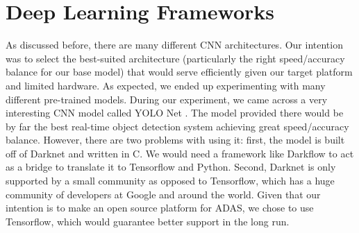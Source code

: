 \section{Deep Learning Frameworks}
As discussed before, there are many different CNN architectures. Our intention was to select the best-suited architecture (particularly the right speed/accuracy balance for our base model) that would serve efficiently given our target platform and limited hardware. As expected, we ended up experimenting with many different pre-trained models. During our experiment, we came across a very interesting CNN model called YOLO Net \cite{YOLO-v1,YOLO-v2}. The model provided there would be by far the best real-time object detection system achieving great speed/accuracy balance. However, there are two problems with using it: first, the model is built off of Darknet \cite{darknet} and written in C. We would need a framework like Darkflow to act as a bridge to translate it to Tensorflow \cite{Tensorflow} and Python.  Second, Darknet is only supported by a small community as opposed to Tensorflow, which has a huge community of developers at Google and around the world. Given that our intention is to make an open source platform for ADAS, we chose to use Tensorflow, which would guarantee better support in the long run. 
\par \bigskip
